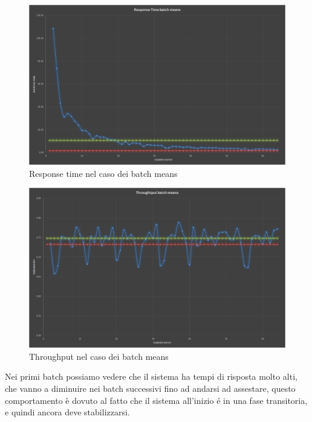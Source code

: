 \begin{figure}[H]
 \centering
 \includegraphics[scale=0.4]{img/resTimeBM.png}
 \caption[Response time nel caso dei batch means]{Response time nel caso dei batch means}
 \label{fig:Response time nel caso dei batch means}
\end{figure}

\begin{figure}[H]
 \centering
 \includegraphics[scale=0.4]{img/throughputBM.png}
 \caption[Throughput nel caso dei batch means]{Throughput nel caso dei batch means}
 \label{fig:Throughput nel caso dei batch means}
\end{figure}

Nei primi batch possiamo vedere che il sistema ha tempi di risposta molto alti, che vanno a
diminuire nei batch successivi fino ad andarsi ad assestare, questo comportamento è dovuto al
fatto che il sistema all'inizio \'e in una fase transitoria, e quindi ancora deve stabilizzarsi.

